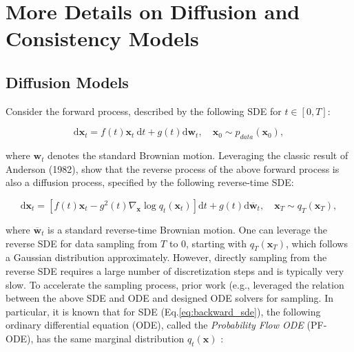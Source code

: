 \documentclass{article} %
\begin{document}



\appendix

\section{More Details on Diffusion and Consistency Models}
\label{app:preliminary}

\subsection{Diffusion Models}

Consider the forward process, described by the following SDE for $t\in[0, T]$:
\begin{small}
\begin{equation}
    \mathrm{d} \boldsymbol{x}_t=f(t) \boldsymbol{x}_t \mathrm{~d} t+g(t) \mathrm{d} \boldsymbol{w}_t, \quad \boldsymbol{x}_0 \sim p_{data}\left(\boldsymbol{x}_0\right),
\end{equation}
\end{small}
where $\boldsymbol{w}_t$ denotes the standard Brownian motion.
Leveraging the classic result of Anderson (1982), \cite{song2020score} show that the reverse process of the above forward process is also a diffusion process, specified by
the following reverse-time SDE:
\begin{small}
\begin{equation}
    \mathrm{d} \boldsymbol{x}_t=\left[f(t) \boldsymbol{x}_t-g^2(t) \nabla_{\boldsymbol{x}} \log q_t\left(\boldsymbol{x}_t\right)\right] \mathrm{d} t+g(t) \mathrm{d} \overline{\boldsymbol{w}}_t, \quad \boldsymbol{x}_T \sim q_T\left(\boldsymbol{x}_T\right) \label{eq:backward_sde},
\end{equation}
\end{small}
where $\overline{\boldsymbol{w}}_t$ is a standard reverse-time Brownian motion.
One can leverage the reverse SDE for data sampling from $T$ to $0$, starting with $q_T(\boldsymbol{x}_T)$, which follows a Gaussian distribution approximately. 
However, directly sampling from the reverse SDE requires a large number of discretization steps and is typically very slow.
To accelerate the sampling process, prior work (e.g., \citep{song2020score, lu2022dpm} leveraged
the relation between the above SDE and ODE and designed ODE solvers for sampling.
In particular, it is known that for SDE (Eq.\ref{eq:backward_sde}), the following ordinary differential equation (ODE), called the \textit{Probability Flow ODE} (PF-ODE), has the same marginal distribution $q_t(\boldsymbol{x})$ \citep{song2020score, lu2022dpm}:
\end{document}
